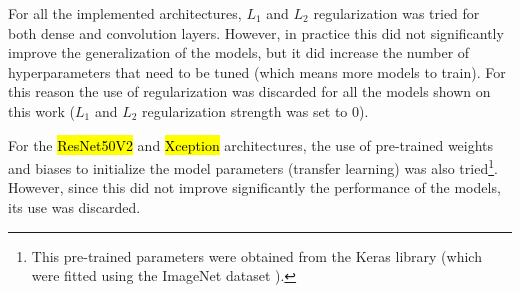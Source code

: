
\glsresetall
\graphicspath{{./Sections/Methodology/Resources/}}

For all the implemented architectures, $L_1$ and $L_2$ regularization was tried for both dense and convolution layers.
However, in practice this did not significantly improve the generalization of the models, but it did increase the number of hyperparameters that need to be tuned (which means more models to train). For this reason the use of regularization was discarded for all the models shown on this work ($L_1$ and $L_2$ regularization strength was set to 0).

For the \hl{ResNet50V2} and \hl{Xception} architectures, the use of pre-trained weights and biases to initialize the model parameters (transfer learning) was also tried\footnote{This pre-trained parameters were obtained from the Keras library (which were fitted using the ImageNet dataset \cite{ILSVRC15}).}. However, since this did not improve significantly the performance of the models, its use was discarded.
